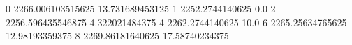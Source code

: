 0 2266.006103515625 13.731689453125
1 2252.2744140625 0.0
2 2256.596435546875 4.322021484375
4 2262.2744140625 10.0
6 2265.25634765625 12.98193359375
8 2269.86181640625 17.58740234375
